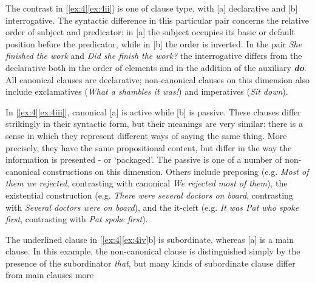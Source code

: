 The contrast in [\ref{ex:4}\ref{ex:4ii}] is one of {clause type}, with [a] declarative and [b] interrogative. The syntactic difference in this particular pair concerns the relative order of subject and predicator: in [a] the subject occupies its basic or default position before the predicator, while in [b] the order is inverted. In the pair \textit{She finished the work} and \textit{Did she finish the work?} the interrogative differs from the declarative both in the order of elements and in the addition of the auxiliary \textit{\textbf{do}}. All canonical clauses are declarative; non-canonical clauses on this dimension also include exclamatives (\textit{What a shambles it was!}) and imperatives (\textit{Sit down}).

In [\ref{ex:4}\ref{ex:4iii}], canonical [a] is {active} while [b] is {passive}. These clauses differ strikingly in their syntactic form, but their meanings are very similar: there is a sense in which they represent different ways of saying the same thing. More precisely, they have the same propositional content, but differ in the way the information is presented - or `packaged'. The passive is one of a number of non-canonical constructions on this dimension. Others include preposing (e.g. \textit{Most of them we rejected}, contrasting with canonical \textit{We rejected most of them}), the existential construction (e.g. \textit{There were several doctors on board}, contrasting with \textit{Several doctors were on board}), and the it-cleft (e.g. \textit{It was Pat who spoke first}, contrasting with \textit{Pat spoke first}).

The underlined clause in [\ref{ex:4}\ref{ex:4iv}b] is {subordinate}, whereas [a] is a {main clause}. In this example, the non-canonical clause is distinguished simply by the presence of the subordinator \textit{that}, but many kinds of subordinate clause differ from main clauses more


\newpage

